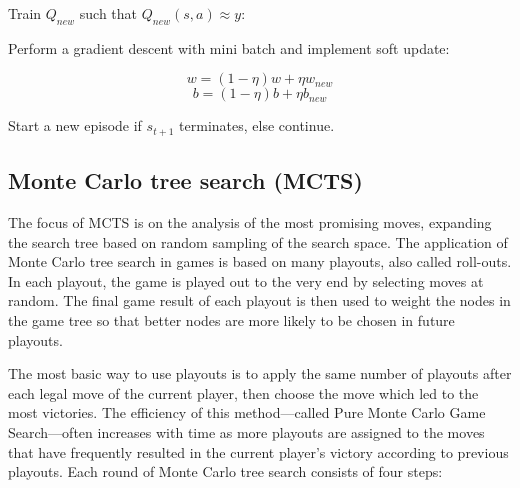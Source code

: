 \documentclass{article}
\begin{document}
\noindent \hspace{1cm} Train \(Q_{new}\) such that \(Q_{new}(s, a) \approx y\):

\noindent \hspace{1cm} Perform a gradient descent with mini batch and implement soft update:

\[w = (1 - \eta)w + \eta w_{new}\]
\[b = (1 - \eta)b + \eta b_{new}\]

\bigskip

\noindent \hspace{1cm} Start a new episode if \(s_{t+1}\) terminates, else continue.

\subsection{Monte Carlo tree search (MCTS)}

\noindent The focus of MCTS is on the analysis of the most promising moves, expanding the search tree based on random sampling of the search space. The application of Monte Carlo tree search in games is based on many playouts, also called roll-outs. In each playout, the game is played out to the very end by selecting moves at random. The final game result of each playout is then used to weight the nodes in the game tree so that better nodes are more likely to be chosen in future playouts.

\bigskip

\noindent The most basic way to use playouts is to apply the same number of playouts after each legal move of the current player, then choose the move which led to the most victories. The efficiency of this method—called Pure Monte Carlo Game Search—often increases with time as more playouts are assigned to the moves that have frequently resulted in the current player's victory according to previous playouts. Each round of Monte Carlo tree search consists of four steps:
\end{document}
